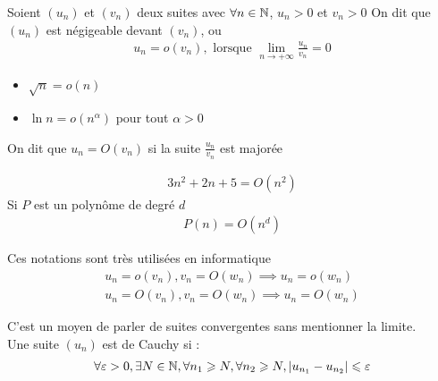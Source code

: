 \begin{remarque}
Soient $(u_n)$ et $(v_n)$ deux suites avec $\forall n \in \mathbb{N}$, $u_n > 0$ et $v_n > 0$ On dit que $(u_n)$ est négigeable devant $(v_n)$, ou 
\begin{align*}
    u_n = o(v_n), \text{ lorsque } \lim_{n \to +\infty} \frac{u_n}{v_n} = 0
\end{align*}
\end{remarque}

\begin{exemple}
    \begin{itemize}
        \item $\sqrt{n} = o(n)$
        \item $\ln n = o(n^{\alpha})$ pour tout $\alpha > 0$
    \end{itemize}
\end{exemple}

\begin{remarque}
On dit que $u_n = O(v_n)$ si la suite $\frac{u_n}{v_n}$ est majorée
\end{remarque}

\begin{exemple}
    \begin{align*}
        3n^2 + 2n + 5 = O(n^2)
    \end{align*}
    Si $P$ est un polynôme de degré $d$
    \begin{align*}
        P(n) = O(n^d)
    \end{align*}
\end{exemple}

\begin{remarque}
Ces notations sont très utilisées en informatique
\begin{align*}
    u_n = o(v_n), v_n = O(w_n) \implies u_n = o(w_n) \\
    u_n = O(v_n), v_n = O(w_n) \implies u_n = O(w_n)
\end{align*}
\end{remarque}

\begin{graybox}
\begin{definition}
C'est un moyen de parler de suites convergentes sans mentionner la limite. \\
Une suite $(u_n)$ est de Cauchy si :
\begin{align*}
    \forall \varepsilon > 0, \exists N \in \mathbb{N}, \forall n_1 \geqslant N, \forall n_2 \geqslant N, |u_{n_1} - u_{n_2}| \leqslant \varepsilon
\end{align*}
\end{definition}
\end{graybox}
